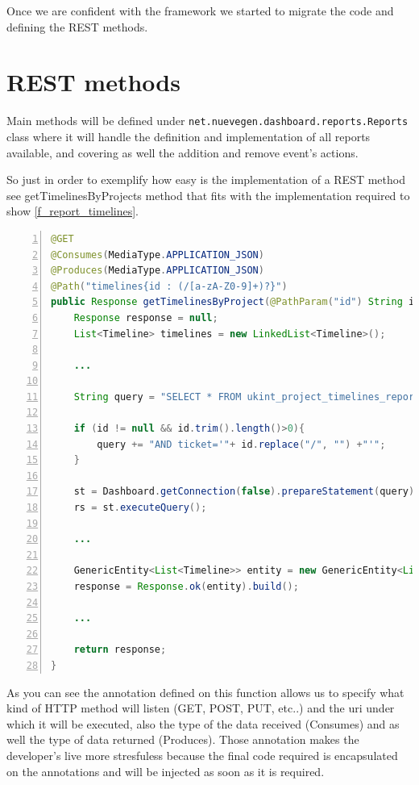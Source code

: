Once we are confident with the framework we started to migrate the code and
defining the REST methods.

\section{REST methods}
Main methods will be defined under
\texttt{net.nuevegen.dashboard.reports.Reports} class where it will handle
the definition and implementation of all reports available, and covering as well
the addition and remove event's actions. 

So just in order to exemplify how easy is the implementation of a REST method
see getTimelinesByProjects method that fits with the implementation required to
show \ref{f_report_timelines}.

\begin{lstlisting}[language=Java,breaklines=true,caption=Reports.getTimelinesByProjects(),label=f_migration_gettimelines,frame=single,captionpos=b,numbers=left,
] @GET
@Consumes(MediaType.APPLICATION_JSON)
@Produces(MediaType.APPLICATION_JSON)
@Path("timelines{id : (/[a-zA-Z0-9]+)?}")
public Response getTimelinesByProject(@PathParam("id") String id) {
	Response response = null;
	List<Timeline> timelines = new LinkedList<Timeline>(); 

	...
	
	String query = "SELECT * FROM ukint_project_timelines_reports WHERE 1 ";

	if (id != null && id.trim().length()>0){
		query += "AND ticket='"+ id.replace("/", "") +"'";
	}
	
	st = Dashboard.getConnection(false).prepareStatement(query);
	rs = st.executeQuery();
	
	...
	
	GenericEntity<List<Timeline>> entity = new GenericEntity<List<Timeline>>(timelines) {};
	response = Response.ok(entity).build();
	
	...
	
	return response;
}
\end{lstlisting}

As you can see the annotation defined on this function allows us to specify what
kind of HTTP method will listen (GET, POST, PUT, etc..) and the uri under which
it will be executed, also the type of the data received (Consumes) and as well
the type of data returned (Produces). Those annotation makes the developer's
live more stresfuless because the final code required is encapsulated on the
annotations and will be injected as soon as it is required.

